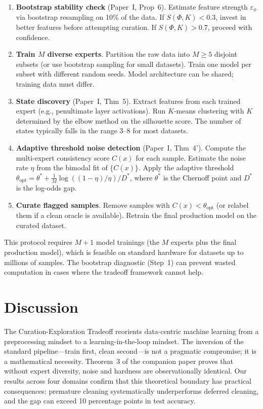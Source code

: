 \documentclass[12pt,a4paper]{article}
\begin{document}
\begin{enumerate}
	\item \textbf{Bootstrap stability check} (Paper~I, Prop~6). Estimate feature strength $\varepsilon_\phi$ via bootstrap resampling on 10\% of the data. If $S(\Phi, K) < 0.3$, invest in better features before attempting curation. If $S(\Phi, K) > 0.7$, proceed with confidence.
	\item \textbf{Train $M$ diverse experts}. Partition the raw data into $M \geq 5$ disjoint subsets (or use bootstrap sampling for small datasets). Train one model per subset with different random seeds. Model architecture can be shared; training data must differ.
	\item \textbf{State discovery} (Paper~I, Thm~5). Extract features from each trained expert (e.g., penultimate layer activations). Run $K$-means clustering with $K$ determined by the elbow method on the silhouette score. The number of states typically falls in the range 3--8 for most datasets.
	\item \textbf{Adaptive threshold noise detection} (Paper~I, Thm~4'). Compute the multi-expert consistency score $C(x)$ for each sample. Estimate the noise rate $\eta$ from the bimodal fit of $\{C(x)\}$. Apply the adaptive threshold $\theta_{\text{opt}} = \theta^* + \frac{1}{M} \log((1-\eta)/\eta)/D^*$, where $\theta^*$ is the Chernoff point and $D^*$ is the log-odds gap.
	\item \textbf{Curate flagged samples}. Remove samples with $C(x) < \theta_{\text{opt}}$ (or relabel them if a clean oracle is available). Retrain the final production model on the curated dataset.
\end{enumerate}

This protocol requires $M+1$ model trainings (the $M$ experts plus the final production model), which is feasible on standard hardware for datasets up to millions of samples. The bootstrap diagnostic (Step~1) can prevent wasted computation in cases where the tradeoff framework cannot help.

\section{Discussion}

The Curation-Exploration Tradeoff reorients data-centric machine learning from a preprocessing mindset to a learning-in-the-loop mindset. The inversion of the standard pipeline---train first, clean second---is not a pragmatic compromise; it is a mathematical necessity. Theorem~3 of the companion paper proves that without expert diversity, noise and hardness are observationally identical. Our results across four domains confirm that this theoretical boundary has practical consequences: premature cleaning systematically underperforms deferred cleaning, and the gap can exceed 10 percentage points in test accuracy.
\end{document}
